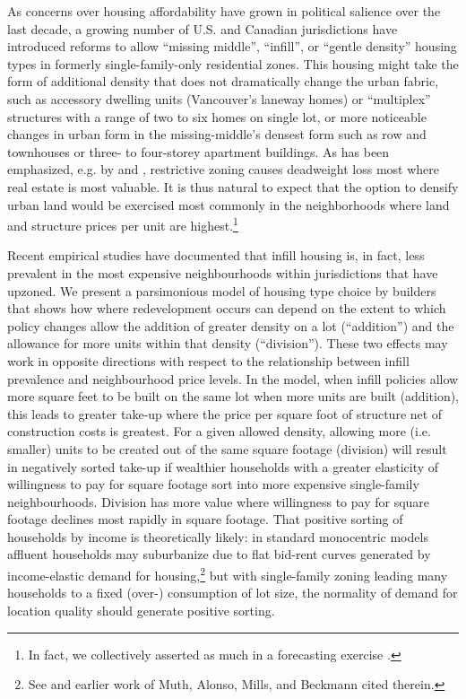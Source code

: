 \documentclass[12pt]{article}
\begin{document}
As concerns over housing affordability have grown in political salience over
the last decade, a growing number of U.S. and Canadian jurisdictions have
introduced reforms to allow ``missing middle'', ``infill'', or ``gentle
density'' housing types in formerly single-family-only residential zones. This
housing might take the form of additional density that does not dramatically
change the urban fabric, such as accessory dwelling units (Vancouver's laneway
homes) or ``multiplex'' structures with a range of two to six homes on single
lot, or more noticeable changes in urban form in the missing-middle's densest
form such as row and townhouses or three- to four-storey apartment buildings.
As has been emphasized, e.g. by \textcite{bruecknerSingh} and
\textcite{HsiehMoretti}, restrictive zoning causes deadweight loss most where
real estate is most valuable. It is thus natural to expect that the option to
densify urban land would be exercised most commonly in the neighborhoods where
land and structure prices per unit are highest.\footnote{In fact, we collectively asserted as much in a forecasting exercise \textcite{SSMUH}.}

Recent empirical studies have documented that infill housing is, in fact, less
prevalent in the most expensive neighbourhoods within jurisdictions that have
upzoned. We present a parsimonious model of housing type choice by builders
that shows how where redevelopment occurs can depend on the extent to which
policy changes allow the addition of greater density on a lot (``addition'')
and the allowance for more units within that density (``division''). These two
effects may work in opposite directions with respect to the relationship
between infill prevalence and neighbourhood price levels. In the model, when 
infill policies allow more square feet to be built on the same lot when more units are built
(addition), this leads to greater take-up where the price per square foot of
structure net of construction costs is greatest. For a given allowed density,
allowing more (i.e. smaller) units to be created out of the same square footage
(division) will result in negatively sorted take-up if wealthier households
with a greater elasticity of willingness to pay for square footage sort into
more expensive single-family neighbourhoods. Division has more value where
willingness to pay for square footage declines most rapidly in square footage.
That positive sorting of households by income is theoretically likely: in
standard monocentric models affluent households may suburbanize due to flat
bid-rent curves generated by income-elastic demand for housing,\footnote{See
	\textcite{Wheaton77} and earlier work of Muth, Alonso, Mills, and
Beckmann cited therein.} but with single-family zoning leading many households
to a fixed (over-) consumption of lot size, the normality of demand for
location quality should generate positive sorting.
\end{document}
